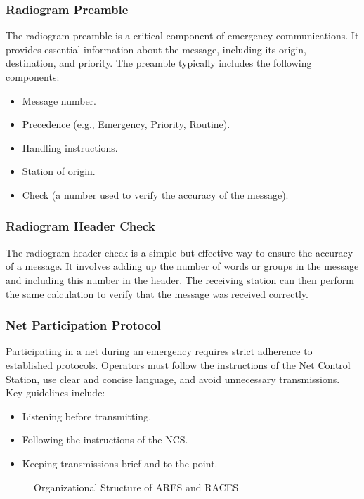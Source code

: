 \subsubsection*{Radiogram Preamble}
The radiogram preamble is a critical component of emergency communications. It provides essential information about the message, including its origin, destination, and priority. The preamble typically includes the following components:
\begin{itemize}[noitemsep]    \item Message number.
    \item Precedence (e.g., Emergency, Priority, Routine).
    \item Handling instructions.
    \item Station of origin.
    \item Check (a number used to verify the accuracy of the message).
\end{itemize}

\subsubsection*{Radiogram Header Check}
The radiogram header check is a simple but effective way to ensure the accuracy of a message. It involves adding up the number of words or groups in the message and including this number in the header. The receiving station can then perform the same calculation to verify that the message was received correctly.

\subsubsection*{Net Participation Protocol}
Participating in a net during an emergency requires strict adherence to established protocols. Operators must follow the instructions of the Net Control Station, use clear and concise language, and avoid unnecessary transmissions. Key guidelines include:
\begin{itemize}[noitemsep]    \item Listening before transmitting.
    \item Following the instructions of the NCS.
    \item Keeping transmissions brief and to the point.
\end{itemize}

\begin{figure}[h!]
    \centering
    \caption{Organizational Structure of ARES and RACES}
    \label{fig:ares-races-structure}
\end{figure}

